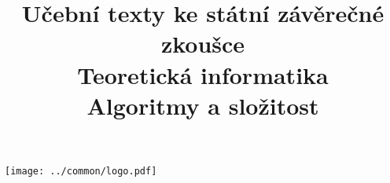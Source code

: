 \clearpage

\clearpage

\title{\LARGE Učební texty ke státní závěrečné zkoušce \\ Teoretická informatika \\ Algoritmy a složitost}




\maketitle

\vspace{10mm}
\begin{center}
\texttt{[image: ../common/logo.pdf]}
\end{center} 

\clearpage

\clearpage

\tableofcontents







